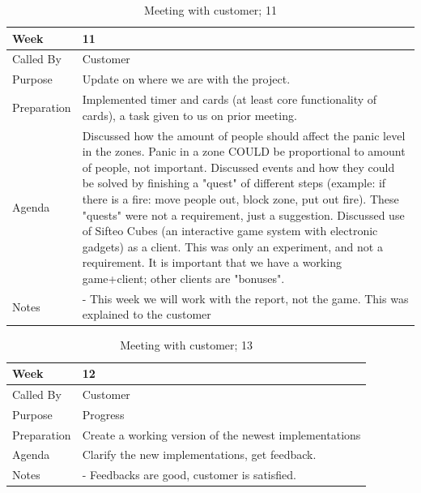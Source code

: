 {\footnotesize
\begin{table}[H]
\begin{tabular}{| p{5cm} | p{10cm} |}\hline
	\textbf{Week}	& \textbf{11} \\ \hline
	Called	By		& Customer\\ \hline
	Purpose		& Update on where we are with the project.\\ \hline
	Preparation 
		& Implemented timer and cards (at least core functionality of cards), a task given to us on prior meeting. \\ 
		
	Agenda
		& Discussed how the amount of people should affect the panic level in the zones. Panic in a zone COULD be proportional to amount of people, not important. Discussed events and how they could be solved by finishing a "quest" of different steps (example: if there is a fire: move people out, block zone, put out fire). These "quests" were not a requirement, just a suggestion. Discussed use of Sifteo Cubes (an interactive game system with electronic gadgets) as a client. This was only an experiment, and not a requirement. It is important that we have a working game+client; other clients are "bonuses".  \\

	Notes	& - This week we will work with the report, not the game. This was explained to the customer\\ \hline
	
\end{tabular}


\caption{Meeting with customer; 11}
\label{fig:meeting_11}
\end{table}}



{\footnotesize
\begin{table}[H]
\begin{tabular}{| p{5cm} | p{10cm} |}\hline
	\textbf{Week}	& \textbf{12} \\ \hline
	Called	By		& Customer\\ \hline
	Purpose		& Progress\\ \hline
	Preparation 
		& Create a working version of the newest implementations \\ 
		
	Agenda
		& Clarify the new implementations, get feedback. \\

	Notes	& - Feedbacks are good, customer is satisfied.\\ \hline
	
\end{tabular}


\caption{Meeting with customer; 13}
\label{fig:meeting_12}
\end{table}}



